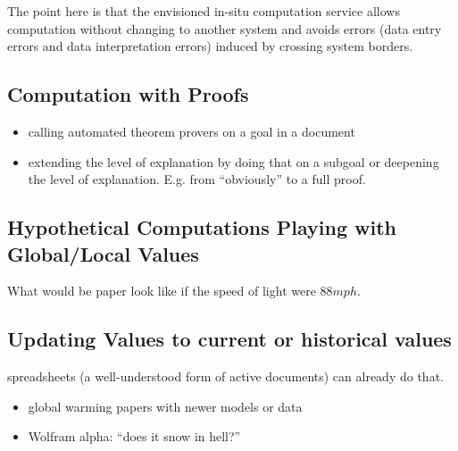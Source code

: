 The point here is that the envisioned in-situ computation service allows computation
without changing to another system and avoids errors (data entry errors and data
interpretation errors) induced by crossing system borders.

\subsection{Computation with Proofs}
\begin{itemize}
  \item calling automated theorem provers on a goal in a document
  \item extending the level of explanation by doing that on a subgoal or deepening the
    level of explanation. E.g. from ``obviously'' to a full proof.  
  \end{itemize}

\subsection{Hypothetical Computations Playing with Global/Local Values}\label{sec:hyp}
What would be paper look like if the speed of light were $88 mph$. 

\subsection{Updating Values to current or historical values}
spreadsheets (a well-understood form of active documents) can already do that. 
\begin{itemize}
\item global warming papers with newer models or data
\item Wolfram alpha: ``does it snow in hell?''
\end{itemize}





